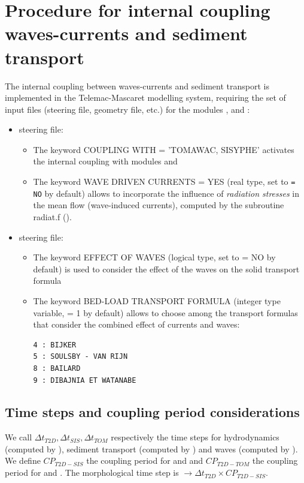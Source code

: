 \section{Procedure for internal coupling waves-currents and sediment transport}
The internal coupling between waves-currents and sediment transport is implemented in the Telemac-Mascaret modelling system, requiring the set of input files (steering file, geometry file, etc.) for the modules , \tomawac{} and \sisyphe{}:
\begin{itemize}
  \item {} steering file:
\begin{itemize}
\item The keyword {\ttfamily COUPLING WITH = 'TOMAWAC, SISYPHE'} activates the internal coupling with modules \tomawac{} and \sisyphe{}
\item The keyword {\ttfamily WAVE DRIVEN CURRENTS = YES} (real type, set to \texttt{= NO} by default) allows to incorporate the influence of \textit{radiation stresses} in the mean flow (wave-induced currents), computed by the subroutine {\ttfamily radiat.f} (\tomawac{}).
\end{itemize}

 \item \sisyphe{} steering file:
\begin{itemize}
\item The keyword {\ttfamily EFFECT OF WAVES} (logical type, set to {\ttfamily = NO} by default) is used to consider the effect of the waves on the solid transport formula
\item The keyword {\ttfamily BED-LOAD TRANSPORT FORMULA} (integer type variable, {\ttfamily = 1} by default) allows to choose among the transport formulas that consider the combined effect of currents and waves:
\begin{lstlisting}[frame=trBL]    
4 : BIJKER 
5 : SOULSBY - VAN RIJN 
8 : BAILARD 
9 : DIBAJNIA ET WATANABE
\end{lstlisting}
\end{itemize}
\end{itemize}

\subsection{Time steps and coupling period considerations}
We call $\Delta t_{T2D}, \Delta t_{SIS}, \Delta t_{TOM}$ respectively the time steps for hydrodynamics (computed by ), sediment transport (computed by \sisyphe{}) and waves (computed by \tomawac{}). We define $CP_{T2D-SIS}$ the coupling period for  and \sisyphe{} and $CP_{T2D-TOM}$ the coupling period for  and \tomawac{}. The morphological time step is $\rightarrow \Delta t_{T2D} \times CP_{T2D-SIS}$.

